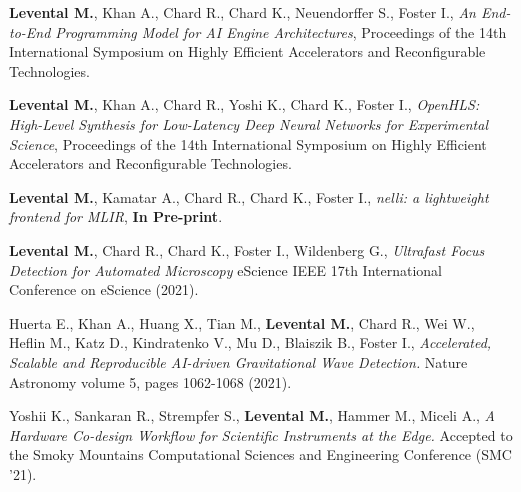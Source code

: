 \documentclass[11pt,letterpaper,roman,colorlinks,linkcolor=blue]{moderncv}
\begin{document}
\begin{hangingpar}
\textbf{Levental M.}, Khan A., Chard R., Chard K., Neuendorffer S., Foster I.,
\textit{An End-to-End Programming Model for AI Engine Architectures},
Proceedings of the 14th International Symposium on Highly Efficient Accelerators and Reconfigurable Technologies.
\end{hangingpar}

\begin{hangingpar}
\textbf{Levental M.}, Khan A., Chard R., Yoshi K., Chard K., Foster I.,
\textit{OpenHLS: High-Level Synthesis for Low-Latency Deep Neural Networks for Experimental Science},
Proceedings of the 14th International Symposium on Highly Efficient Accelerators and Reconfigurable Technologies.
\end{hangingpar}

\begin{hangingpar}
\textbf{Levental M.}, Kamatar A., Chard R., Chard K., Foster I.,
\textit{nelli: a lightweight frontend for MLIR},
\textbf{In Pre-print}.
\end{hangingpar}

\begin{hangingpar}
\textbf{Levental M.}, Chard R., Chard K., Foster I., Wildenberg G.,
\textit{Ultrafast Focus Detection for Automated Microscopy} 
eScience IEEE 17th International Conference on eScience (2021).
\end{hangingpar}


\begin{hangingpar}
Huerta E., Khan A., Huang X., Tian M., \textbf{Levental M.}, Chard R., Wei W., Heflin M., Katz D., Kindratenko V., Mu D., Blaiszik B., Foster I.,
\textit{Accelerated, Scalable and Reproducible AI-driven Gravitational Wave Detection.} 
Nature Astronomy volume 5, pages 1062-1068 (2021).
\end{hangingpar}

\begin{hangingpar}
Yoshii K., Sankaran R., Strempfer S., \textbf{Levental M.}, Hammer M., Miceli A.,
\textit{A Hardware Co-design Workflow for Scientific Instruments at the Edge.} 
Accepted to the Smoky Mountains Computational Sciences and Engineering Conference (SMC '21).
\end{hangingpar}
\end{document}
